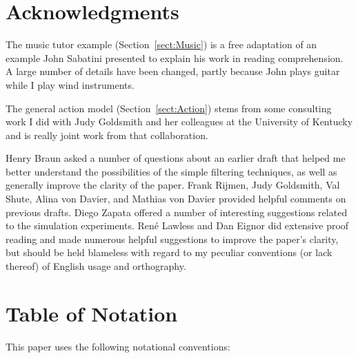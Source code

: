 \documentclass[12pt]{RR-article}
\begin{document}
\newpage
\section*{Acknowledgments} 

The music tutor example (Section~\ref{sect:Music}) is a free
adaptation of an example John Sabatini presented to explain his work
in reading comprehension.  A large number of details have been
changed, partly because John plays guitar while I play wind
instruments.

The general action model (Section~\ref{sect:Action}) stems from some
consulting work I did with Judy Goldsmith and her colleagues at the
University of Kentucky and is really joint work from that
collaboration.  

Henry Braun asked a number of questions about an earlier draft that
helped me better understand the possibilities of the simple filtering
techniques, as well as generally improve the clarity of the paper.
Frank Rijmen, Judy Goldsmith, Val Shute, Alina von Davier, and Mathias
von Davier provided helpful comments on previous drafts.  Diego Zapata
offered a number of interesting suggestions related to the simulation
experiments.  Ren\'e Lawless and Dan Eignor did extensive proof
reading and made numerous helpful suggestions to improve the paper's
clarity, but should be held blameless with regard to my peculiar
conventions (or lack thereof) of English usage and orthography.

\newpage
\section*{Table of Notation}

This paper uses the following notational conventions:
\end{document}

